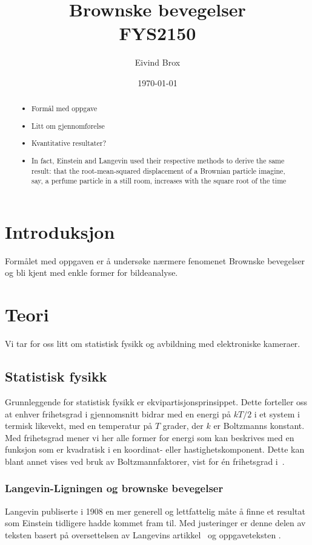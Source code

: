 \documentclass[a4paper,11pt, twocolumn]{article}
\title{Brownske bevegelser \\ FYS2150}
\author{Eivind Brox}
\date{\today}
\begin{document}
\maketitle

\begin{abstract}
	\begin{itemize}
		\item Formål med oppgave
		\item Litt om gjennomførelse
		\item Kvantitative resultater?
		\item In fact, Einstein and
			Langevin used their respective methods to derive the same
			result: that the root-mean-squared displacement of a Brownian
			particle imagine, say, a perfume particle in a still room,
			increases with the square root of the time
	\end{itemize}
\end{abstract}

\section{Introduksjon}
Formålet med oppgaven er å undersøke nærmere fenomenet Brownske bevegelser og bli kjent med enkle former for bildeanalyse.
\section{Teori}
Vi tar for oss litt om statistisk fysikk og avbildning med elektroniske kameraer. 
\subsection{Statistisk fysikk}
Grunnleggende for statistisk fysikk er ekvipartisjonsprinsippet. Dette forteller oss at enhver frihetsgrad i gjennomsnitt bidrar med en energi på $kT/2$ i et system i termisk likevekt, med en temperatur på $T$ grader, der $k$ er Boltzmanns konstant. Med frihetsgrad mener vi her alle former for energi som kan beskrives med en funksjon som er kvadratisk i en koordinat- eller hastighetskomponent. Dette kan blant annet vises ved bruk av Boltzmannfaktorer, vist for \'en frihetsgrad i~\cite[sek. 6.3]{Schroeder2000}.

\subsubsection{Langevin-Ligningen og brownske bevegelser}
Langevin publiserte i 1908 en mer generell og lettfattelig måte å finne et resultat som Einstein tidligere hadde kommet fram til. Med justeringer er denne delen av teksten basert på oversettelsen av Langevins artikkel~\cite{LemonsGythiel1997} og oppgaveteksten \cite{brownske}.
\end{document}
